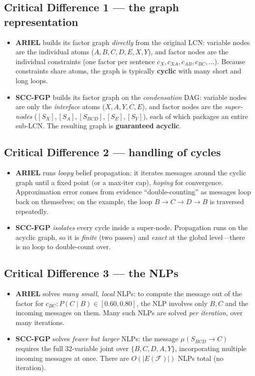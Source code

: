 \documentclass[11pt]{article}
\newcommand{\cF}{\mathcal{F}}
\begin{document}
\subsection{Critical Difference 1 --- the graph representation}
\begin{itemize}
  \item \textbf{ARIEL} builds its factor graph \emph{directly} from the
        original LCN: variable nodes are the individual atoms
        ($A,B,C,D,E,X,Y$), and factor nodes are the individual constraints
        (one factor per sentence $c_X,c_{XA},c_{AB},c_{BC},\dots$). Because
        constraints share atoms, the graph is typically \textbf{cyclic} with
        many short and long loops.
  \item \textbf{SCC-FGP} builds its factor graph on the \emph{condensation}
        DAG: variable nodes are only the \emph{interface} atoms
        ($X,A,Y,C,E$), and factor nodes are the \emph{super-nodes}
        ($[S_X],[S_A],[S_{BCD}],[S_E],[S_Y]$), each of which packages an
        entire sub-LCN. The resulting graph is \textbf{guaranteed acyclic}.
\end{itemize}

\subsection{Critical Difference 2 --- handling of cycles}
\begin{itemize}
  \item \textbf{ARIEL} runs \emph{loopy} belief propagation: it iterates
        messages around the cyclic graph until a fixed point (or a max-iter
        cap), \emph{hoping} for convergence. Approximation error comes from
        evidence ``double-counting'' as messages loop back on themselves; on
        the example, the loop $B\!\to\!C\!\to\!D\!\to\!B$ is traversed
        repeatedly.
  \item \textbf{SCC-FGP} \emph{isolates} every cycle inside a super-node.
        Propagation runs on the acyclic graph, so it is \emph{finite} (two
        passes) and \emph{exact} at the global level---there is no loop to
        double-count over.
\end{itemize}

\subsection{Critical Difference 3 --- the NLPs}
\begin{itemize}
  \item \textbf{ARIEL} solves \emph{many small, local} NLPs: to compute the
        message out of the factor for $c_{BC}: P(C\mid B)\in[0.60,0.80]$, the
        NLP involves only $B,C$ and the incoming messages on them. Many such
        NLPs are solved \emph{per iteration}, over many iterations.
  \item \textbf{SCC-FGP} solves \emph{fewer but larger} NLPs: the message
        $\mu(S_{BCD}\!\to\!C)$ requires the full $32$-variable joint over
        $\{B,C,D,A,Y\}$, incorporating multiple incoming messages at once.
        There are $O(|E(\cF)|)$ NLPs total (no iteration).
\end{itemize}
\end{document}
